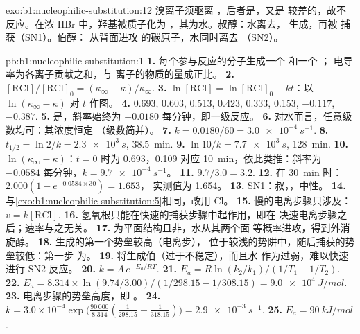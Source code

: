 \begin{solution}{exo:b1:nucleophilic-substitution:12}
溴离子须驱离 ，后者是，又是
较差的，故不反应。在浓 HBr 中，羟基被质子化为
，其为水。叔醇：水离去，
生成，再被  捕获（SN1）。伯醇：
 从背面进攻  的碳原子，水同时离去
（SN2）。
\end{solution}

\begin{solution}{pb:b1:nucleophilic-substitution:1}
\textbf{1.} 每个参与反应的分子生成一个  和一个 ；
电导率为各离子贡献之和，与
离子的物质的量成正比。
\textbf{2.} $[\mathrm{RCl}]/[\mathrm{RCl}]_0 = (\kappa_\infty -
\kappa)/\kappa_\infty$.
\textbf{3.} $\ln[\mathrm{RCl}] = \ln[\mathrm{RCl}]_0 - kt$：以
$\ln(\kappa_\infty - \kappa)$ 对 $t$ 作图。
\textbf{4.} 0.693, 0.603, 0.513, 0.423, 0.333, 0.153, $-0.117$, $-0.387$.
\textbf{5.} 是，斜率始终为 $-0.0180$ 每分钟，即一级反应。
\textbf{6.} 对水而言，任意级数均可：其浓度恒定
（级数简并）。
\textbf{7.} $k = 0.0180/60 = \qty{3.0e-4}{s^{-1}}$.
\textbf{8.} $t_{1/2} = \ln 2/k = \qty{2.3e3}{s}$, \qty{38.5}{min}.
\textbf{9.} $\ln 10/k = \qty{7.7e3}{s}$, \qty{128}{min}.
\textbf{10.} $\ln(\kappa_\infty - \kappa)$：$t = 0$ 时为 0.693，0.109 对应
\qty{10}{min}，依此类推：斜率为 $-0.0584$ 每分钟，$k = \qty{9.7e-4}{s^{-1}}$。
\textbf{11.} $9.7/3.0 = 3.2$.
\textbf{12.} 在 \qty{30}{min} 时：$2.000(1 - e^{-0.0584 \times 30}) = 1.653$，
实测值为 1.654。
\textbf{13.} SN1：叔，，中性。
\textbf{14.} 与\cref{exo:b1:nucleophilic-substitution:5}相同，改用 Cl。
\textbf{15.} 慢的电离步骤只涉及：$v =
k[\mathrm{RCl}]$.
\textbf{16.} 氢氧根只能在快速的捕获步骤中起作用，即在
决速电离步骤之后；速率与之无关。
\textbf{17.} 为平面结构且非，水从其两个面
等概率进攻，得到外消旋醇。
\textbf{18.} 生成的第一个势垒较高（电离步），
位于较浅的势阱中，随后捕获的势垒较低：第一步
为。
\textbf{19.} 将生成伯（过于不稳定），而且水
作为过弱，难以快速进行 SN2 反应。
\textbf{20.} $k = A\,e^{-E_a/RT}$.
\textbf{21.} $E_a = R\ln(k_2/k_1)/(1/T_1 - 1/T_2)$.
\textbf{22.} $E_a = 8.314 \times \ln(9.74/3.00)/(1/298.15 - 1/308.15) =
\qty{9.0e4}{J/mol}$.
\textbf{23.} 电离步骤的势垒高度，即
。
\textbf{24.} $k = 3.0 \times 10^{-4} \exp\bigl(\frac{90\,000}{8.314}
(\frac{1}{298.15} - \frac{1}{318.15})\bigr) = \qty{2.9e-3}{s^{-1}}$.
\textbf{25.} \textbf{$E_a = \qty{90}{kJ/mol}$}.
\end{solution}
